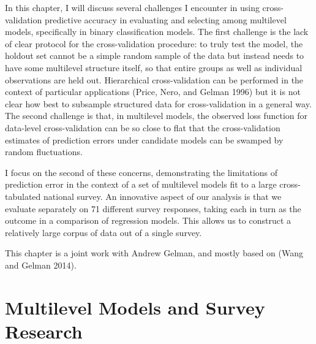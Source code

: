 \documentclass[11pt,article,oneside]{memoir}
\begin{document}
In this chapter, I will discuss several challenges I encounter in using
cross-validation predictive accuracy in evaluating and selecting among
multilevel models, specifically in binary classification models. The
first challenge is the lack of clear protocol for the cross-validation
procedure: to truly test the model, the holdout set cannot be a simple
random sample of the data but instead needs to have some multilevel
structure itself, so that entire groups as well as individual
observations are held out. Hierarchical cross-validation can be
performed in the context of particular applications (Price, Nero, and
Gelman 1996) but it is not clear how best to subsample structured data
for cross-validation in a general way. The second challenge is that, in
multilevel models, the observed loss function for data-level
cross-validation can be so close to flat that the cross-validation
estimates of prediction errors under candidate models can be swamped by
random fluctuations.

I focus on the second of these concerns, demonstrating the limitations
of prediction error in the context of a set of multilevel models fit to
a large cross-tabulated national survey. An innovative aspect of our
analysis is that we evaluate separately on 71 different survey
responses, taking each in turn as the outcome in a comparison of
regression models. This allows us to construct a relatively large corpus
of data out of a single survey.

This chapter is a joint work with Andrew Gelman, and mostly based on
(Wang and Gelman 2014).

\section{Multilevel Models and Survey
Research}\label{multilevel-models-and-survey-research}
\end{document}
